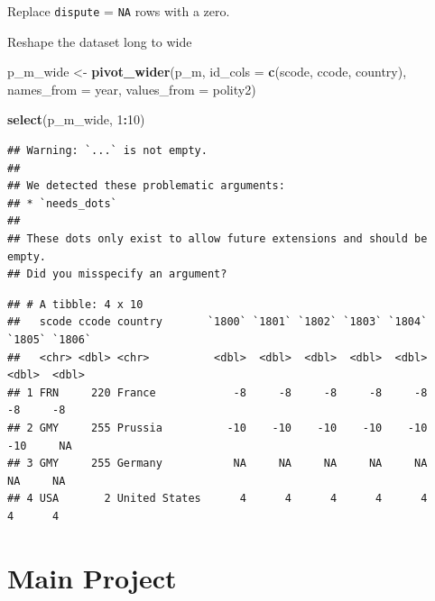 \documentclass[
]{book}
\newenvironment{Shaded}{\begin{snugshade}}{\end{snugshade}}
\newcommand{\DataTypeTok}[1]{\textcolor[rgb]{0.13,0.29,0.53}{#1}}
\newcommand{\DecValTok}[1]{\textcolor[rgb]{0.00,0.00,0.81}{#1}}
\newcommand{\KeywordTok}[1]{\textcolor[rgb]{0.13,0.29,0.53}{\textbf{#1}}}
\newcommand{\NormalTok}[1]{#1}
\newcommand{\OperatorTok}[1]{\textcolor[rgb]{0.81,0.36,0.00}{\textbf{#1}}}
\newcommand{\StringTok}[1]{\textcolor[rgb]{0.31,0.60,0.02}{#1}}
\theoremstyle{definition}
\theoremstyle{definition}
\theoremstyle{definition}
\theoremstyle{definition}
\theoremstyle{remark}
\begin{document}
Replace \texttt{dispute} = \texttt{NA} rows with a zero.

\begin{Shaded}
\end{Shaded}

Reshape the dataset long to wide

\begin{Shaded}
\begin{Highlighting}[]
\NormalTok{p_m_wide <-}\StringTok{ }\KeywordTok{pivot_wider}\NormalTok{(p_m, }
                        \DataTypeTok{id_cols =} \KeywordTok{c}\NormalTok{(scode, ccode, country),}
                        \DataTypeTok{names_from =}\NormalTok{ year,}
                        \DataTypeTok{values_from =}\NormalTok{ polity2)}

\KeywordTok{select}\NormalTok{(p_m_wide, }\DecValTok{1}\OperatorTok{:}\DecValTok{10}\NormalTok{)}
\end{Highlighting}
\end{Shaded}

\begin{verbatim}
## Warning: `...` is not empty.
## 
## We detected these problematic arguments:
## * `needs_dots`
## 
## These dots only exist to allow future extensions and should be empty.
## Did you misspecify an argument?
\end{verbatim}

\begin{verbatim}
## # A tibble: 4 x 10
##   scode ccode country       `1800` `1801` `1802` `1803` `1804` `1805` `1806`
##   <chr> <dbl> <chr>          <dbl>  <dbl>  <dbl>  <dbl>  <dbl>  <dbl>  <dbl>
## 1 FRN     220 France            -8     -8     -8     -8     -8     -8     -8
## 2 GMY     255 Prussia          -10    -10    -10    -10    -10    -10     NA
## 3 GMY     255 Germany           NA     NA     NA     NA     NA     NA     NA
## 4 USA       2 United States      4      4      4      4      4      4      4
\end{verbatim}

\hypertarget{main-project}{%
\section{Main Project}\label{main-project}}
\end{document}
